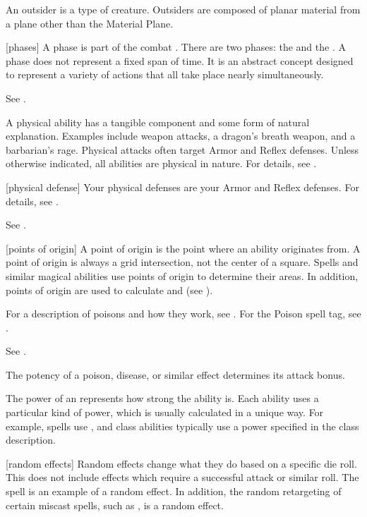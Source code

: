  An outsider is a type of creature.
Outsiders are composed of planar material from a plane other than the Material Plane.

[phases] A phase is part of the combat .
There are two phases: the  and the .
A phase does not represent a fixed span of time.
It is an abstract concept designed to represent a variety of actions that all take place nearly simultaneously.

 See .

 A physical ability has a tangible component and some form of natural explanation.
Examples include weapon attacks, a dragon's breath weapon, and a barbarian's rage.
Physical attacks often target Armor and Reflex defenses.
Unless otherwise indicated, all abilities are physical in nature.
For details, see .

[physical defense] Your physical defenses are your Armor and Reflex defenses.
For details, see .

 See .

[points of origin] A point of origin is the point where an ability originates from.
A point of origin is always a grid intersection, not the center of a square.
Spells and similar magical abilities use points of origin to determine their areas.
In addition, points of origin are used to calculate  and  (see ).

 For a description of poisons and how they work, see . For the Poison spell tag, see .

 See .

 The potency of a poison, disease, or similar effect determines its attack bonus.

 The power of an  represents how strong the ability is.
Each ability uses a particular kind of power, which is usually calculated in a unique way.
For example, spells use , and class abilities typically use a power specified in the class description.

[random effects] Random effects change what they do based on a specific die roll.
This does not include effects which require a successful attack or similar roll.
The  spell is an example of a random effect.
In addition, the random retargeting of certain miscast spells, such as , is a random effect.

